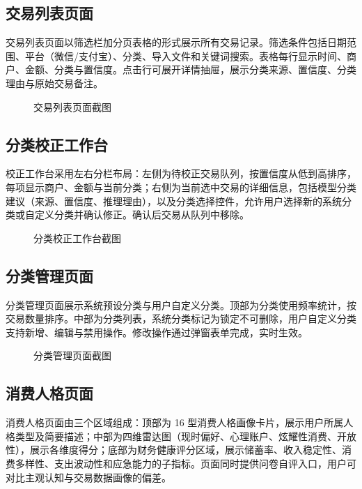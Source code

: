 \subsection{交易列表页面}

交易列表页面以筛选栏加分页表格的形式展示所有交易记录。筛选条件包括日期范围、平台（微信/支付宝）、分类、导入文件和关键词搜索。表格每行显示时间、商户、金额、分类与置信度。点击行可展开详情抽屉，展示分类来源、置信度、分类理由与原始交易备注。

\begin{figure}[H]
  \centering
  \caption{交易列表页面截图}
  \label{fig:screenshot-transactions}
\end{figure}

\clearpage
\subsection{分类校正工作台}

校正工作台采用左右分栏布局：左侧为待校正交易队列，按置信度从低到高排序，每项显示商户、金额与当前分类；右侧为当前选中交易的详细信息，包括模型分类建议（来源、置信度、推理理由），以及分类选择控件，允许用户选择新的系统分类或自定义分类并确认修正。确认后交易从队列中移除。

\begin{figure}[H]
  \centering
  \caption{分类校正工作台截图}
  \label{fig:screenshot-review}
\end{figure}

\subsection{分类管理页面}

分类管理页面展示系统预设分类与用户自定义分类。顶部为分类使用频率统计，按交易数量排序。中部为分类列表，系统分类标记为锁定不可删除，用户自定义分类支持新增、编辑与禁用操作。修改操作通过弹窗表单完成，实时生效。

\begin{figure}[H]
  \centering
  \caption{分类管理页面截图}
  \label{fig:screenshot-categories}
\end{figure}

\clearpage
\subsection{消费人格页面}

消费人格页面由三个区域组成：顶部为 16 型消费人格画像卡片，展示用户所属人格类型及简要描述；中部为四维雷达图（现时偏好、心理账户、炫耀性消费、开放性），展示各维度得分；底部为财务健康评分区域，展示储蓄率、收入稳定性、消费多样性、支出波动性和应急能力的子指标。页面同时提供问卷自评入口，用户可对比主观认知与交易数据画像的偏差。

